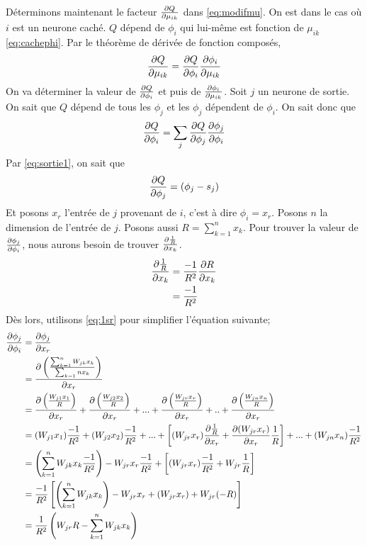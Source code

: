 Déterminons maintenant le facteur $\frac{\partial Q}{\partial \mu_{ik}}$ dans \eqref{eq:modifmu}. On est dans le cas où $i$ est un neurone caché.
$Q$ dépend de $\phi_i$ qui lui-même est fonction de $\mu_{ik}$ \eqref{eq:cachephi}. Par le théorème de dérivée de fonction composés,
\begin{equation}\label{eq:composemu}
 \frac{\partial Q}{\partial \mu_{ik}} = \frac{\partial Q}{\partial \phi_i} \frac{\partial \phi_i}{\partial \mu_{ik}}
\end{equation}
On va déterminer la valeur de $\frac{\partial Q}{\partial \phi_i}$ et puis de $\frac{\partial \phi_i}{\partial \mu_{ik}}$.
Soit $j$ un neurone de sortie. On sait que $Q$ dépend de tous les $\phi_j$ et les $\phi_j$ dépendent de $\phi_i$. On sait donc que
\begin{equation}\label{eq:mufact1}
 \frac{\partial Q}{\partial \phi_i} = \sum_{j} \frac{\partial Q}{\partial \phi_j}\frac{\partial \phi_j}{\partial \phi_i}
\end{equation}
Par \eqref{eq:sortie1}, on sait que
\[\frac{\partial Q}{\partial \phi_j} = (\phi_j - s_j)\]
Et posons $x_r$ l'entrée de $j$ provenant de $i$, c'est à dire $\phi_i = x_r$.
Posons $n$ la dimension de l'entrée de $j$.
Posons aussi $R = \sum_{k=1}^{n}x_k$.
Pour trouver la valeur de $\frac{\partial \phi_j}{\partial \phi_i}$, nous aurons besoin de trouver $\frac{\partial \frac{1}{R}}{\partial x_k}$.
\begin{equation}\label{eq:1sr}
 \begin{split}
 \frac{\partial \frac{1}{R}}{\partial x_k} & = \frac{-1}{R^2}\frac{\partial R}{\partial x_k}\\
 ~ & = \frac{-1}{R^2}
 \end{split}
\end{equation}
Dès lors, utilisons \eqref{eq:1sr} pour simplifier l'équation suivante;
\begin{equation}\label{eq:phiiphij}
 \begin{split}
 \frac{\partial \phi_j}{\partial \phi_i} & = \frac{\partial \phi_j}{\partial x_r}\\
 ~ & = \frac{\partial \left(\frac{\sum_{k=1}^{n}W_{jk}x_k}{\sum_{k=1}{n}x_k}\right)}{\partial x_r}\\
 ~ & = \frac{\partial \left(\frac{W_{j1}x_1}{R}\right)}{\partial x_r} + \frac{\partial \left(\frac{W_{j2}x_2}{R}\right)}{\partial x_r} + ... + \frac{\partial \left(\frac{W_{jr}x_r}{R}\right)}{\partial x_r} + .. + \frac{\partial \left(\frac{W_{jn}x_n}{R}\right)}{\partial x_r}\\
 ~ & = (W_{j1}x_1)\frac{-1}{R^2} + (W_{j2}x_2)\frac{-1}{R^2} + ... + \left[(W_{jr}x_r)\frac{\partial \frac{1}{R}}{\partial x_r}+\frac{\partial (W_{jr}x_r)}{\partial x_r}\frac{1}{R}\right] + ... + (W_{jn}x_n)\frac{-1}{R^2}\\
 ~ & = \left(\sum_{k=1}^{n}W_{jk}x_k\frac{-1}{R^2}\right)-W_{jr}x_r\frac{-1}{R^2} + \left[(W_{jr}x_r)\frac{-1}{R^2}+W_{jr}\frac{1}{R}\right]\\
 ~ & = \frac{-1}{R^2} \left[\left(\sum_{k=1}^{n}W_{jk}x_k\right)-W_{jr}x_r + (W_{jr}x_r) + W_{jr}(-R)\right]\\
 ~ & = \frac{1}{R^2} \left(W_{jr}R - \sum_{k=1}^{n}W_{jk}x_k\right)
 \end{split}
\end{equation}
